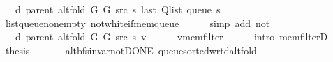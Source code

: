 \begin{isabellebody}
\ {\isachardoublequoteopen}{\isachardot}{\kern0pt}{\isachardot}{\kern0pt}{\isachardot}{\kern0pt}\ {\isacharequal}{\kern0pt}\ d\ {\isacharparenleft}{\kern0pt}parent\ {\isacharparenleft}{\kern0pt}alt{\isacharunderscore}{\kern0pt}fold\ G{}\ G{}\ src\ s{\isacharparenright}{\kern0pt}{\isacharparenright}{\kern0pt}\ {\isacharparenleft}{\kern0pt}last\ {\isacharparenleft}{\kern0pt}Q{\isacharunderscore}{\kern0pt}list\ {\isacharparenleft}{\kern0pt}queue\ s{\isacharparenright}{\kern0pt}{\isacharparenright}{\kern0pt}{\isacharparenright}{\kern0pt}{\isachardoublequoteclose}\isanewline
\ \ \ \ \isamarkupfalse%
\ list{\isacharunderscore}{\kern0pt}queue{\isacharunderscore}{\kern0pt}non{\isacharunderscore}{\kern0pt}empty\ not{\isacharunderscore}{\kern0pt}white{\isacharunderscore}{\kern0pt}if{\isacharunderscore}{\kern0pt}mem{\isacharunderscore}{\kern0pt}queue\isanewline
\ \ \ \ \isamarkupfalse%
\ {\isacharparenleft}{\kern0pt}simp\ add{\isacharcolon}{\kern0pt}\ not{\isacharunderscore}{\kern0pt}{\isacharparenleft}{\kern0pt}{}{\isacharparenright}{\kern0pt}{\isacharparenright}{\kern0pt}\isanewline
\ \ \isamarkupfalse%
\ \isamarkupfalse%
\ {\isachardoublequoteopen}{\isachardot}{\kern0pt}{\isachardot}{\kern0pt}{\isachardot}{\kern0pt}\ {\isasymle}\ d\ {\isacharparenleft}{\kern0pt}parent\ {\isacharparenleft}{\kern0pt}alt{\isacharunderscore}{\kern0pt}fold\ G{}\ G{}\ src\ s{\isacharparenright}{\kern0pt}{\isacharparenright}{\kern0pt}\ v{\isachardoublequoteclose}\isanewline
\ \ \ \ \isamarkupfalse%
\ v{\isacharunderscore}{\kern0pt}mem{\isacharunderscore}{\kern0pt}filter\isanewline
\ \ \ \ \isamarkupfalse%
\ {\isacharparenleft}{\kern0pt}intro\ mem{\isacharunderscore}{\kern0pt}filterD{\isacharparenleft}{\kern0pt}{}{\isacharparenright}{\kern0pt}{\isacharparenright}{\kern0pt}\isanewline
\ \ \isamarkupfalse%
\ \isamarkupfalse%
\ {\isacharquery}{\kern0pt}thesis\isanewline
\ \ \ \ \isacommand{{\isachardot}{\kern0pt}}\isamarkupfalse%
\isanewline
{}\isamarkupfalse%
%
\endisatagproof
{\isafoldproof}%
%
\isadelimproof
\isanewline
%
\endisadelimproof
\isanewline
{}\isamarkupfalse%
\ {\isacharparenleft}{\kern0pt}\ alt{\isacharunderscore}{\kern0pt}bfs{\isacharunderscore}{\kern0pt}invar{\isacharunderscore}{\kern0pt}not{\isacharunderscore}{\kern0pt}DONE{\isacharparenright}{\kern0pt}\ queue{\isacharunderscore}{\kern0pt}sorted{\isacharunderscore}{\kern0pt}wrt{\isacharunderscore}{\kern0pt}d{\isacharunderscore}{\kern0pt}alt{\isacharunderscore}{\kern0pt}fold{\isacharcolon}{\kern0pt}\isanewline

\end{isabellebody}
